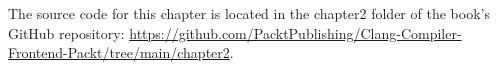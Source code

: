 The source code for this chapter is located in the chapter2 folder of the book’s GitHub repository: \url{https://github.com/PacktPublishing/Clang-Compiler-Frontend-Packt/tree/main/chapter2}.